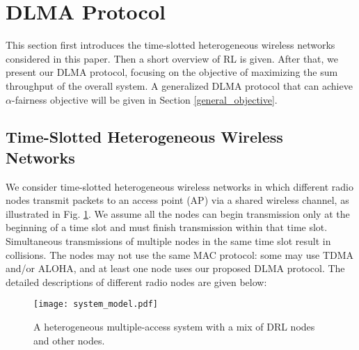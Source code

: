 \documentclass[journal,comsoc]{IEEEtran}
\begin{document}
\section{DLMA Protocol}\label{DLMA_protocol}
This section first introduces the time-slotted heterogeneous wireless networks considered in this paper. Then a short overview of RL is given. After that, we present our DLMA protocol, focusing on the objective of maximizing the sum throughput of the overall system. A generalized DLMA protocol that can achieve  $ \alpha $-fairness objective will be given in Section \ref{general_objective}. 
\subsection{Time-Slotted Heterogeneous Wireless Networks}\label{system_model}
We consider time-slotted heterogeneous wireless networks in which different radio nodes transmit packets to an access point (AP) via a shared wireless channel, as illustrated in Fig. \ref{fig:system_model}. We assume all the nodes can begin transmission only at the beginning of a time slot and must finish transmission within that time slot. Simultaneous transmissions of multiple nodes in the same time slot result in collisions. The nodes may not use the same MAC protocol: some may use TDMA and/or ALOHA, and at least one node uses our proposed DLMA protocol. The detailed descriptions of different radio nodes are given below:
\begin{figure}[!t]
	\centering
	\texttt{[image: system\_model.pdf]}
	\caption{A heterogeneous multiple-access system with a mix of DRL nodes and other nodes.}
	\label{fig:system_model}
\end{figure}
\end{document}
